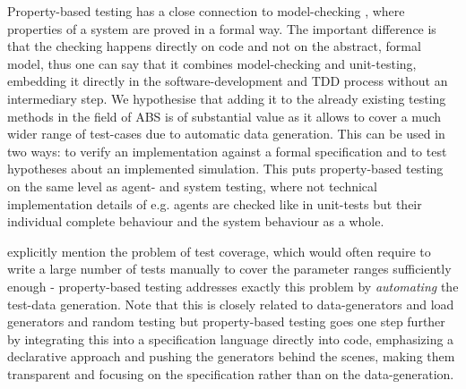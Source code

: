 Property-based testing has a close connection to model-checking \cite{mcmillan_symbolic_1993}, where properties of a system are proved in a formal way. The important difference is that the checking happens directly on code and not on the abstract, formal model, thus one can say that it combines model-checking and unit-testing, embedding it directly in the software-development and TDD process without an intermediary step. We hypothesise that adding it to the already existing testing methods in the field of ABS is of substantial value as it allows to cover a much wider range of test-cases due to automatic data generation. This can be used in two ways: to verify an implementation against a formal specification and to test hypotheses about an implemented simulation. This puts property-based testing on the same level as agent- and system testing, where not technical implementation details of e.g. agents are checked like in unit-tests but their individual complete behaviour and the system behaviour as a whole.

\cite{onggo_test-driven_2016} explicitly mention the problem of test coverage, which would often require to write a large number of tests manually to cover the parameter ranges sufficiently enough - property-based testing addresses exactly this problem by \textit{automating} the test-data generation. Note that this is closely related to data-generators \cite{gurcan_generic_2013} and load generators and random testing \cite{burnstein_practical_2010} but property-based testing goes one step further by integrating this into a specification language directly into code, emphasizing a declarative approach and pushing the generators behind the scenes, making them transparent and focusing on the specification rather than on the data-generation. 